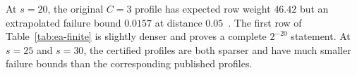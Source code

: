 At $s=20$, the original $C=3$ profile has expected row weight $46.42$ but an
extrapolated failure bound $0.0157$ at distance $0.05$~\cite{EA}.  The first
row of Table~\ref{tab:ea-finite} is slightly denser and proves a complete
$2^{-20}$ statement.  At $s=25$ and $s=30$, the certified profiles are both
sparser and have much smaller failure bounds than the corresponding published
profiles.
